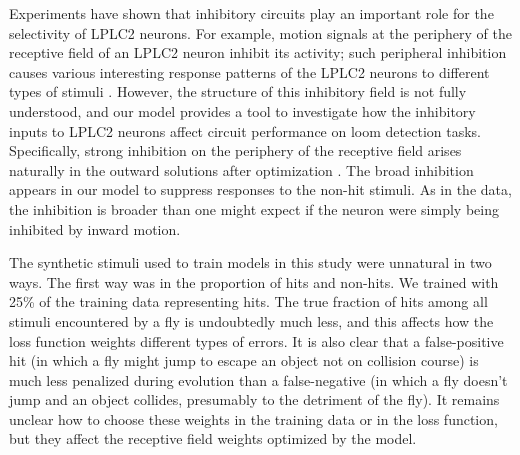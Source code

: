 \documentclass[pdftex,9pt,lineno]{elife}
\begin{document}
Experiments have shown that inhibitory circuits play an important role for the selectivity of LPLC2 neurons. For example, motion signals at the periphery of the receptive field of an LPLC2 neuron inhibit its activity; such peripheral inhibition causes various interesting response patterns of the LPLC2 neurons to different types of stimuli \citep{klapoetke2017ultra}. However, the structure of this inhibitory field is not fully understood, and our model provides a tool to investigate how the inhibitory inputs to LPLC2 neurons affect circuit performance on loom detection tasks. Specifically, strong inhibition on the periphery of the receptive field arises naturally in the outward solutions after optimization \citep{klapoetke2017ultra}. The broad inhibition appears in our model to suppress responses to the non-hit stimuli. As in the data, the inhibition is broader than one might expect if the neuron were simply being inhibited by inward motion.

The synthetic stimuli used to train models in this study were unnatural in two ways. The first way was in the proportion of hits and non-hits. We trained with 25\% of the training data representing hits. The true fraction of hits among all stimuli encountered by a fly is undoubtedly much less, and this affects how the loss function weights different types of errors. It is also clear that a false-positive hit (in which a fly might jump to escape an object not on collision course) is much less penalized during evolution than a false-negative (in which a fly doesn't jump and an object collides, presumably to the detriment of the fly). It remains unclear how to choose these weights in the training data or in the loss function, but they affect the receptive field weights optimized by the model.
\end{document}
